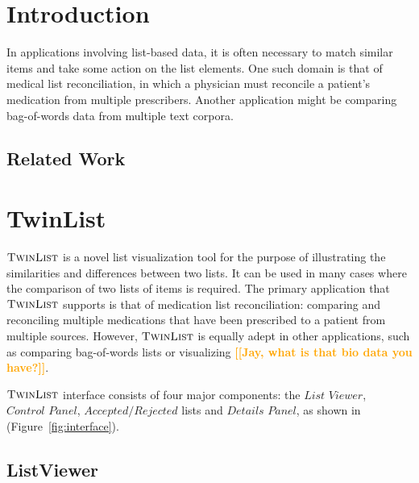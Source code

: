 \documentclass{chi2009}
\newcommand{\todo}[1]{\textsf{\textbf{\textcolor{Orange}{[[#1]]}}}}
\newcommand{\TwinList}{\textsc{TwinList}}
\newcommand{\ListViewer}{\textit{List Viewer}}
\newcommand{\AcceptedRejected}{\textit{Accepted/Rejected}}
\newcommand{\Controls}{\textit{Control Panel}}
\newcommand{\Details}{\textit{Details Panel}}
\begin{document}


\section{Introduction}
In applications involving list-based data, it is often necessary to match similar items and take some action on the list elements. One such domain is that of medical list reconciliation, in which a physician must reconcile a patient's medication from multiple prescribers. Another application might be comparing bag-of-words data from multiple text corpora.

\subsection{Related Work}

\section{TwinList}
$\TwinList$ is a novel list visualization tool for the purpose of illustrating the similarities and differences between two lists. It can be used in many cases where the comparison of two lists of items is required. The primary application that $\TwinList$ supports is that of medication list reconciliation: comparing and reconciling multiple medications that have been prescribed to a patient from multiple sources\cite{JCAHO-2006}. However, $\TwinList$ is equally adept in other applications, such as comparing bag-of-words lists or visualizing \todo{Jay, what is that bio data you have?}. 

$\TwinList$ interface consists of four major components: the $\ListViewer$, $\Controls$, $\AcceptedRejected$ lists and $\Details$, as shown in (Figure~\ref{fig:interface}).


\subsection{ListViewer}
\end{document}
